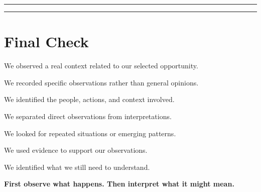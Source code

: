 \documentclass[12pt,a4paper]{article}
\newcommand{\checkbox}{\fbox{\rule{0pt}{0.8ex}\rule{0.8ex}{0pt}}}
\begin{document}
	\vspace{0.1cm}
	
	\rule{\linewidth}{0.4pt}
	
	\vspace{0.35cm}
	
	\rule{\linewidth}{0.4pt}
	
	\section*{Final Check}
	
	\checkbox\quad We observed a real context related to our selected opportunity.
	
	\vspace{0.15cm}
	
	\checkbox\quad We recorded specific observations rather than general opinions.
	
	\vspace{0.15cm}
	
	\checkbox\quad We identified the people, actions, and context involved.
	
	\vspace{0.15cm}
	
	\checkbox\quad We separated direct observations from interpretations.
	
	\vspace{0.15cm}
	
	\checkbox\quad We looked for repeated situations or emerging patterns.
	
	\vspace{0.15cm}
	
	\checkbox\quad We used evidence to support our observations.
	
	\vspace{0.15cm}
	
	\checkbox\quad We identified what we still need to understand.
	
	\vspace{0.3cm}
	
	\begin{center}
		\textbf{First observe what happens. Then interpret what it might mean.}
	\end{center}
	
\end{document}
